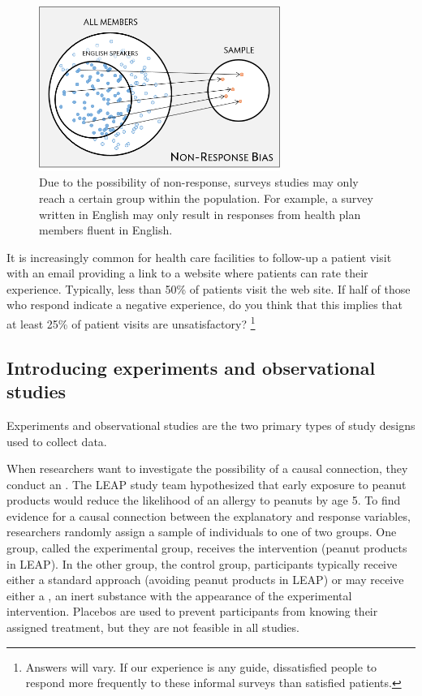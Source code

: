 \begin{doublespace}
\begin{figure}[h]
	\centering
	{\includegraphics[width=0.70\textwidth]{ch_intro_to_data_oi_biostat/figures/sampleHealthPlan/sampleNonResponseHealthPlan.png}
	\caption{Due to the possibility of non-response, surveys studies may only reach a certain group within the population. For example, a survey written in English may only result in responses from health plan members fluent in English.}}
	\label{sampleNonResponseHealthPlan}
\end{figure}


\begin{exercise}
It is increasingly common for health care facilities to follow-up a patient visit with an email providing a link to a website where patients can rate their experience.  Typically, less than 50\% of patients visit the web site.  If half of those who respond indicate a negative experience, do you think that this implies that at least 25\% of patient visits are unsatisfactory?	\footnote{Answers will vary. If our experience is any guide, dissatisfied people to respond more frequently to these informal surveys than satisfied patients.}
\end{exercise}


\subsection{Introducing experiments and observational studies}

Experiments and observational studies are the two primary types of study designs used to collect data.

When researchers want to investigate the possibility of a causal connection, they conduct an . The LEAP study team hypothesized that early exposure to peanut products would reduce the likelihood of an allergy to peanuts by age 5. To find evidence for a causal connection between the explanatory and response variables, researchers randomly assign a sample of individuals to one of two groups.  One group, called the experimental group, receives the intervention (peanut products in LEAP). In the other group, the control group, participants typically receive either a standard approach (avoiding peanut products in LEAP) or may receive either a , an inert substance with the appearance of the experimental intervention.  Placebos are used to prevent participants from knowing their assigned treatment, but they are not feasible in all studies.


\end{doublespace}
